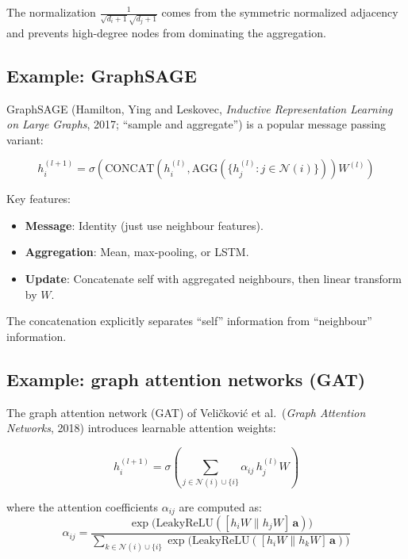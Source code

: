\begin{notechapter}
\begin{example}
The normalization $\frac{1}{\sqrt{d_i+1}\sqrt{d_j+1}}$ comes from the
symmetric normalized adjacency and prevents high-degree nodes from
dominating the aggregation.
\end{example}

\subsection{Example: GraphSAGE}

GraphSAGE (Hamilton, Ying and Leskovec, \emph{Inductive Representation Learning on Large Graphs}, 2017; ``sample and aggregate'') is a popular message passing variant:

\begin{example}
\[
h_i^{(l+1)} = \sigma\left(
    \text{CONCAT}\left(
    h_i^{(l)}, \text{AGG}(\{h_j^{(l)} : j \in \mathcal{N}(i)\})
    \right) W^{(l)} \right)
\]

Key features:
\begin{itemize}
    \item \textbf{Message}: Identity (just use neighbour features).
    \item \textbf{Aggregation}: Mean, max-pooling, or LSTM.
    \item \textbf{Update}: Concatenate self with aggregated neighbours,
          then linear transform by $W$.
\end{itemize}

The concatenation explicitly separates ``self'' information from
``neighbour'' information.
\end{example}

\subsection{Example: graph attention networks (GAT)}

The graph attention network (GAT) of Veličković et al.\ (\emph{Graph Attention Networks}, 2018) introduces learnable attention weights:

\begin{example}
\[
h_i^{(l+1)} = \sigma\left( \sum_{j \in \mathcal{N}(i) \cup \{i\}}
    \alpha_{ij} \, h_j^{(l)} W \right)
\]

where the attention coefficients $\alpha_{ij}$ are computed as:
\[
\alpha_{ij} = \frac{\exp\bigl(\text{LeakyReLU}(
    [h_i W \| h_j W] \, \mathbf{a})\bigr)}
    {\sum_{k \in \mathcal{N}(i) \cup \{i\}} \exp\bigl(\text{LeakyReLU}(
    [h_i W \| h_k W] \, \mathbf{a})\bigr)}
\]


\end{example}
\end{notechapter}
